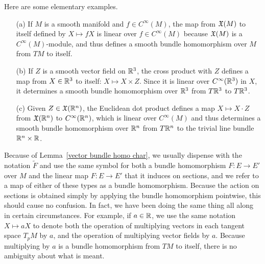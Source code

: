 \begin{example}
Here are some elementary examples.
\begin{itemize}
\item[(a)]If $M$ is a smooth manifold and $f\in C^\infty(M)$, the map from $\mathfrak{X}(M)$ to itself defined by $X\mapsto fX$ is linear over $f\in C^\infty(M)$ because $\mathfrak{X}(M)$ is a $C^\infty(M)$-module, and thus defines a smooth bundle homomorphism over $M$ from $TM$ to itself.
\item[(b)]If $Z$ is a smooth vector field on $\mathbb{R}^3$, the cross product with $Z$ defines a map from $X\in\mathbb{R}^3$ to itself: $X\mapsto X\times Z$. Since it is linear over $C^\infty(\mathbb{R}^3)$ in $X$, it determines a smooth bundle homomorphism over $\mathbb{R}^3$ from $T\mathbb{R}^3$ to $T\mathbb{R}^3$.
\item[(c)]Given $Z\in\mathfrak{X}(\mathbb{R}^n)$, the Euclidean dot product defines a map $X\mapsto X\cdot Z$ from $\mathfrak{X}(\mathbb{R}^n)$ to $C^\infty(\mathbb{R}^n)$, which is linear over $C^\infty(M)$ and thus determines a smooth bundle homomorphism over $\mathbb{R}^n$ from $T\mathbb{R}^n$ to the trivial line bundle $\mathbb{R}^n\times\mathbb{R}$.
\end{itemize}
\end{example}
Because of Lemma~\ref{vector bundle homo char}, we usually dispense with the notation $\widetilde{F}$ and use the same symbol for both a bundle homomorphism $F:E\to E'$ over $M$ and the linear map $F:E\to E'$ that it induces on sections, and we refer to a map of either of these types as a bundle homomorphism. Because the action on sections is obtained simply by applying the bundle homomorphism pointwise, this should cause no confusion. In fact, we have been doing the same thing all along in certain circumstances. For example, if $a\in\mathbb{R}$, we use the same notation $X\mapsto aX$ to denote both the operation of multiplying vectors in each tangent space $T_pM$ by $a$, and the operation of multiplying vector fields by $a$. Because multiplying by $a$ is a bundle homomorphism from $TM$ to itself, there is no ambiguity about what is meant.
